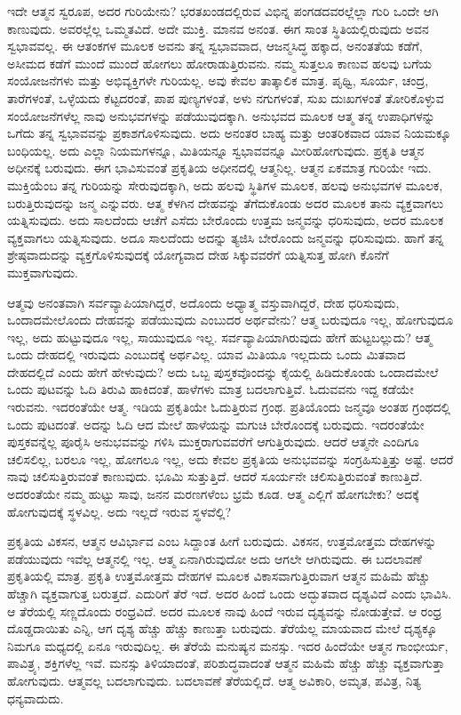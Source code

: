 ಇದೇ ಆತ್ಮನ ಸ್ವರೂಪ, ಅದರ ಗುರಿಯೇನು? ಭರತಖಂಡದಲ್ಲಿರುವ ವಿಭಿನ್ನ ಪಂಗಡದವರಲ್ಲೆಲ್ಲಾ ಗುರಿ ಒಂದೇ ಆಗಿ ಕಾಣುವುದು. ಅವರಲ್ಲೆಲ್ಲ ಒಮ್ಮತವಿದೆ. ಅದೇ ಮುಕ್ತಿ. ಮಾನವ ಅನಂತ. ಈಗ ಸಾಂತ ಸ್ಥಿತಿಯಲ್ಲಿರುವುದು ಅವನ ಸ್ವಭಾವವಲ್ಲ. ಈ ಆತಂಕಗಳ ಮೂಲಕ ಅವನು ತನ್ನ ಸ್ವಭಾವವಾದ, ಆಜನ್ಮಸಿದ್ಧ ಹಕ್ಕಾದ, ಅನಂತತೆಯ ಕಡೆಗೆ, ಅಸೀಮದ ಕಡೆಗೆ ಮುಂದೆ ಮುಂದೆ ಹೋಗಲು ಹೋರಾಡುತ್ತಿರುವನು. ನಮ್ಮ ಸುತ್ತಲೂ ಕಾಣುವ ಹಲವು ಬಗೆಯ ಸಂಯೋಜನೆಗಳು ಮತ್ತು ಅಭಿವ್ಯಕ್ತಿಗಳೇ ಗುರಿಯಲ್ಲ. ಅವು ಕೇವಲ ತಾತ್ಕಾಲಿಕ ಮಾತ್ರ. ಪೃಥ್ವಿ, ಸೂರ್ಯ, ಚಂದ್ರ, ತಾರೆಗಳಂತೆ, ಒಳ್ಳೆಯದು ಕೆಟ್ಟದರಂತೆ, ಪಾಪ ಪುಣ್ಯಗಳಂತೆ, ಅಳು ನಗುಗಳಂತೆ, ಸುಖ ದುಃಖಗಳಂತೆ ತೋರಿಕೊಳ್ಳುವ ಸಂಯೋಜನೆಗಳೆಲ್ಲ ನಾವು ಅನುಭವಗಳನ್ನು ಪಡೆಯುವುದಕ್ಕಾಗಿ. ಅನುಭವದ ಮೂಲಕ ಆತ್ಮ ತನ್ನ ಉಪಾಧಿಗಳನ್ನು ಒಗೆದು ತನ್ನ ಸ್ವಭಾವವನ್ನು ಪ್ರಕಾಶಗೊಳಿಸುವುದು. ಅದು ಅನಂತರ ಬಾಹ್ಯ ಮತ್ತು ಆಂತರಿಕವಾದ ಯಾವ ನಿಯಮಕ್ಕೂ ಬಂಧಿಯಲ್ಲ. ಅದು ಎಲ್ಲಾ ನಿಯಮಗಳನ್ನೂ, ಮಿತಿಯನ್ನೂ ಸ್ವಭಾವವನ್ನೂ ಮೀರಿಹೋಗುವುದು. ಪ್ರಕೃತಿ ಆತ್ಮನ ಅಧೀನಕ್ಕೆ ಬರುವುದು. ಈಗ ಭಾವಿಸುವಂತೆ ಪ್ರಕೃತಿಯ ಅಧೀನದಲ್ಲಿ ಆತ್ಮನಿಲ್ಲ. ಆತ್ಮನ ಏಕಮಾತ್ರ ಗುರಿಯೇ ಇದು. ಮುಕ್ತಿಯೆಂಬ ತನ್ನ ಗುರಿಯನ್ನು ಸೇರುವುದಕ್ಕಾಗಿ, ಅದು ಹಲವು ಸ್ಥಿತಿಗಳ ಮೂಲಕ, ಹಲವು ಅನುಭವಗಳ ಮೂಲಕ, ಬರುತ್ತಿರುವುದನ್ನು ಜನ್ಮ ಎನ್ನುವರು. ಆತ್ಮ ಕೆಳಗಿನ ದೇಹವನ್ನು ತೆಗೆದುಕೊಂಡು ಅದರ ಮೂಲಕ ತಾನು ವ್ಯಕ್ತವಾಗಲು ಯತ್ನಿಸುವುದು. ಅದು ಸಾಲದೆಂದು ಆಚೆಗೆ ಎಸೆದು ಬೇರೊಂದು ಉತ್ತಮ ಜನ್ಮವನ್ನು ಧರಿಸುವುದು, ಅದರ ಮೂಲಕ ವ್ಯಕ್ತವಾಗಲು ಯತ್ನಿಸುವುದು. ಅದೂ ಸಾಲದೆಂದು ಅದನ್ನು ತ್ಯಜಿಸಿ ಬೇರೊಂದು ಜನ್ಮವನ್ನು ಧರಿಸುವುದು. ಹಾಗೆ ತನ್ನ ಶ್ರೇಷ್ಠವಾದುದನ್ನು ವ್ಯಕ್ತಗೊಳಿಸುವುದಕ್ಕೆ ಯೋಗ್ಯವಾದ ದೇಹ ಸಿಕ್ಕುವವರೆಗೆ ಯತ್ನಿಸುತ್ತ ಹೋಗಿ ಕೊನೆಗೆ ಮುಕ್ತವಾಗುವುದು.

ಆತ್ಮವು ಅನಂತವಾಗಿ ಸರ್ವವ್ಯಾಪಿಯಾಗಿದ್ದರೆ, ಅದೊಂದು ಅಧ್ಯಾತ್ಮ ವಸ್ತುವಾಗಿದ್ದರೆ, ದೇಹ ಧರಿಸುವುದು, ಒಂದಾದಮೇಲೊಂದು ದೇಹವನ್ನು ಪಡೆಯುವುದು ಎಂಬುದರ ಅರ್ಥವೇನು? ಆತ್ಮ ಬರುವುದೂ ಇಲ್ಲ, ಹೋಗುವುದೂ ಇಲ್ಲ, ಅದು ಹುಟ್ಟುವುದೂ ಇಲ್ಲ, ಸಾಯುವುದೂ ಇಲ್ಲ. ಸರ್ವವ್ಯಾಪಿಯಾಗಿರುವುದು ಹೇಗೆ ಹುಟ್ಟಬಲ್ಲುದು? ಆತ್ಮ ಒಂದು ದೇಹದಲ್ಲಿ ಇರುವುದು ಎಂಬುದಕ್ಕೆ ಅರ್ಥವಿಲ್ಲ. ಯಾವ ಮಿತಿಯೂ ಇಲ್ಲದುದು ಒಂದು ಮಿತವಾದ ದೇಹದಲ್ಲಿದೆ ಎಂದು ಹೇಗೆ ಹೇಳುವುದು? ಅದು ಒಬ್ಬ ಪುಸ್ತಕವೊಂದನ್ನು ಕೈಯಲ್ಲಿ ಹಿಡಿದುಕೊಂಡು ಒಂದಾದಮೇಲೆ ಒಂದು ಪುಟವನ್ನು ಓದಿ ತಿರುವಿ ಹಾಕಿದಂತೆ, ಹಾಳೆಗಳು ಮಾತ್ರ ಬದಲಾಗುತ್ತಿವೆ. ಓದುವವನು ಇದ್ದ ಕಡೆಯೇ ಇರುವನು. ಇದರಂತೆಯೇ ಆತ್ಮ. ಇಡಿಯ ಪ್ರಕೃತಿಯೇ ಓದುತ್ತಿರುವ ಗ್ರಂಥ. ಪ್ರತಿಯೊಂದು ಜನ್ಮವೂ ಅಂತಹ ಗ್ರಂಥದಲ್ಲಿ ಒಂದು ಪುಟದಂತೆ. ಅದನ್ನು ಓದಿ ಆದ ಮೇಲೆ ಹಾಳೆಯನ್ನು ಮಗುಚಿ ಬೇರೊಂದಕ್ಕೆ ಬರುವುದು. ಇದರಂತೆಯೇ ಪುಸ್ತಕವನ್ನೆಲ್ಲ ಪೂರೈಸಿ ಅನುಭವವನ್ನು ಗಳಿಸಿ ಮುಕ್ತರಾಗುವವರೆಗೆ ಆಗುತ್ತಿರುವುದು. ಆದರೆ ಆತ್ಮನೇ ಎಂದಿಗೂ ಚಲಿಸಲಿಲ್ಲ, ಬರಲೂ ಇಲ್ಲ, ಹೋಗಲೂ ಇಲ್ಲ, ಅದು ಕೇವಲ ಪ್ರಕೃತಿಯ ಅನುಭವವನ್ನು ಸಂಗ್ರಹಿಸುತ್ತಿತ್ತು ಅಷ್ಟೆ. ಆದರೆ ನಾವು ಚಲಿಸುತ್ತಿರುವಂತೆ ಕಾಣುವುದು. ಭೂಮಿ ಸುತ್ತುತ್ತಿದೆ. ಆದರೆ ಸೂರ್ಯನೇ ಚಲಿಸುತ್ತಿರುವಂತೆ ಕಾಣುತ್ತಿದೆ. ಅದರಂತೆಯೇ ನಮ್ಮ ಹುಟ್ಟು ಸಾವು, ಜನನ ಮರಣಗಳೆಂಬ ಭ್ರಮೆ ಕೂಡ. ಆತ್ಮ ಎಲ್ಲಿಗೆ ಹೋಗಬೇಕು? ಅದಕ್ಕೆ ಹೋಗುವುದಕ್ಕೆ ಸ್ಥಳವಿಲ್ಲ. ಅದು ಇಲ್ಲದೆ ಇರುವ ಸ್ಥಳವೆಲ್ಲಿ?

ಪ್ರಕೃತಿಯ ವಿಕಸನ, ಆತ್ಮನ ಆವಿರ್ಭಾವ ಎಂಬ ಸಿದ್ದಾಂತ ಹೀಗೆ ಬರುವುದು. ವಿಕಸನ, ಉತ್ತಮೋತ್ತಮ ದೇಹಗಳನ್ನು ಪಡೆಯುವುದು ಇವೆಲ್ಲ ಆತ್ಮನಲ್ಲಿ ಇಲ್ಲ. ಆತ್ಮ ಏನಾಗಿರುವುದೋ ಅದು ಆಗಲೇ ಆಗಿರುವುದು. ಈ ಬದಲಾವಣೆ ಪ್ರಕೃತಿಯಲ್ಲಿ ಮಾತ್ರ. ಪ್ರಕೃತಿ ಉತ್ತಮೋತ್ತಮ ದೇಹಗಳ ಮೂಲಕ ವಿಕಾಸವಾಗುತ್ತಿರುವಾಗ ಆತ್ಮನ ಮಹಿಮೆ ಹೆಚ್ಚು ಹೆಚ್ಚಾಗಿ ವ್ಯಕ್ತವಾಗುತ್ತ ಬರುತ್ತದೆ. ಎದುರಿಗೆ ತೆರೆ ಇದೆ. ಅದರ ಹಿಂದೆ ಒಂದು ಅದ್ಭುತವಾದ ದೃಶ್ಯವಿದೆ ಎಂದು ಭಾವಿಸಿ. ಆ ತೆರೆಯಲ್ಲಿ ಸಣ್ಣದೊಂದು ರಂಧ್ರವಿದೆ. ಅದರ ಮೂಲಕ ನಾವು ಹಿಂದೆ ಇರುವ ದೃಶ್ಯವನ್ನು ನೋಡುತ್ತೇವೆ. ಆ ರಂಧ್ರ ದೊಡ್ಡದಾಯಿತು ಎನ್ನಿ, ಆಗ ದೃಶ್ಯ ಹೆಚ್ಚು ಹೆಚ್ಚು ಕಾಣುತ್ತಾ ಬರುವುದು. ತೆರೆಯೆಲ್ಲ ಮಾಯವಾದ ಮೇಲೆ ದೃಶ್ಯಕ್ಕೂ ನಿಮಗೂ ಮಧ್ಯದಲ್ಲಿ ಏನೂ ಇರುವುದಿಲ್ಲ. ಈ ತೆರೆಯೆ ಮನುಷ್ಯನ ಮನಸ್ಸು. ಇದರ ಹಿಂದೆಯೇ ಆತ್ಮನ ಗಾಂಭೀರ್ಯ, ಪಾವಿತ್ರ್ಯ, ಶಕ್ತಿಗಳೆಲ್ಲ ಇವೆ. ಮನಸ್ಸು ತಿಳಿಯಾದಂತೆ, ಪರಿಶುದ್ಧವಾದಂತೆ ಆತ್ಮನ ಮಹಿಮೆ ಹೆಚ್ಚು ಹೆಚ್ಚು ವ್ಯಕ್ತವಾಗುತ್ತಾ ಹೋಗುವುದು. ಆತ್ಮವಲ್ಲ ಬದಲಾಗುವುದು. ಬದಲಾವಣೆ ತೆರೆಯಲ್ಲಿದೆ. ಆತ್ಮ ಅವಿಕಾರಿ, ಅಮೃತ, ಪವಿತ್ರ, ನಿತ್ಯ ಧನ್ಯವಾದುದು.

